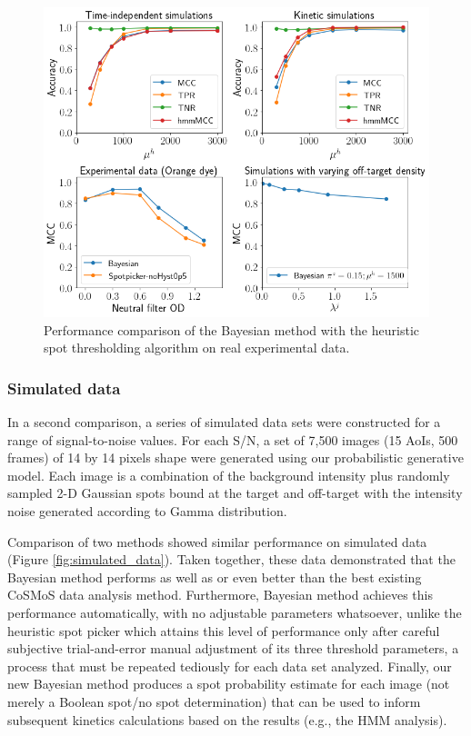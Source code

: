 \begin{figure}
\includegraphics[width=\linewidth]{figures/figure4.png}
\caption{Performance comparison of the Bayesian method with the heuristic spot thresholding algorithm on real experimental data.}
\label{fig:real_data}
\end{figure}

\subsubsection{Simulated data}

In a second comparison, a series of simulated data sets were constructed for a range of signal-to-noise values. For each S/N, a set of 7,500 images (15 AoIs, 500 frames) of 14 by 14 pixels shape were generated using our probabilistic generative model. Each image is a combination of the background intensity plus randomly sampled 2-D Gaussian spots bound at the target and off-target with the intensity noise generated according to Gamma distribution.

Comparison of two methods showed similar performance on simulated data (Figure \ref{fig:simulated_data}). Taken together, these data demonstrated that the Bayesian method performs as well as or even better than the best existing CoSMoS data analysis method. Furthermore, Bayesian method achieves this performance automatically, with no adjustable parameters whatsoever, unlike the heuristic spot picker which attains this level of performance only after careful subjective trial-and-error manual adjustment of its three threshold parameters, a process that must be repeated tediously for each data set analyzed. Finally, our new Bayesian method produces a spot probability estimate for each image (not merely a Boolean spot/no spot determination) that can be used to inform subsequent kinetics calculations based on the results (e.g., the HMM analysis).

